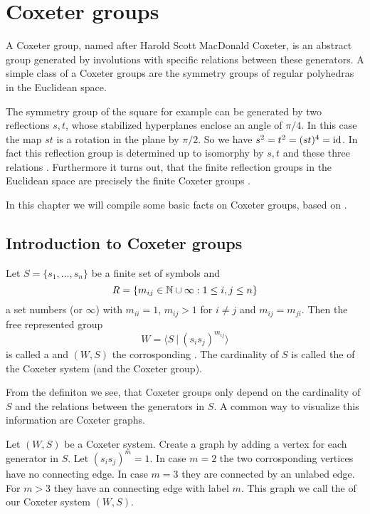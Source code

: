 \section{Coxeter groups}
\label{sec:coxeter-groups}

A Coxeter group, named after Harold Scott MacDonald Coxeter, is an abstract group generated by involutions with specific relations between these generators. A simple class of a Coxeter groups are the symmetry groups of regular polyhedras in the Euclidean space.

The symmetry group of the square for example can be generated by two reflections $s,t$, whose stabilized hyperplanes enclose an angle of $\pi / 4$. In this case the map $st$ is a rotation in the plane by $\pi / 2$. So we have $s^2 = t^2 = (st)^4 = \operatorname{id}$. In fact this reflection group is determined up to isomorphy by $s,t$ and these three relations \cite[Theorem 1.9]{humphreys:coxeter}. Furthermore it turns out, that the finite reflection groups in the Euclidean space are precisely the finite Coxeter groups \cite[Theorem 6.4]{humphreys:coxeter}.

In this chapter we will compile some basic facts on Coxeter groups, based on \cite{humphreys:coxeter}.

\subsection{Introduction to Coxeter groups}

\begin{defi}
	Let $S = \{ s_1, \ldots, s_n \}$ be a finite set of symbols and
	$$R = \{ m_{ij} \in \mathbb{N} \cup \infty : 1 \leq i,j \leq n \}$$
	a set numbers (or $\infty$) with $m_{ii} = 1$, $m_{ij} > 1$ for $i \neq j$ and $m_{ij} = m_{ji}$. Then the free represented group
	$$W = \langle S \ | \ (s_i s_j)^{m_{ij}} \rangle$$
	is called a  and $(W,S)$ the corrosponding . The cardinality of $S$ is called the  of the Coxeter system (and the Coxeter group).
\end{defi}

From the definiton we see, that Coxeter groups only depend on the cardinality of $S$ and the relations between the generators in $S$. A common way to visualize this information are Coxeter graphs.

\begin{defi}
	Let $(W,S)$ be a Coxeter system. Create a graph by adding a vertex for each generator in $S$. Let $(s_i s_j)^m = 1$. In case $m = 2$ the two corrosponding vertices have no connecting edge. In case $m = 3$ they are connected by an unlabed edge. For $m > 3$ they have an connecting edge with label $m$. This graph we call the  of our Coxeter system $(W,S)$.
\end{defi}

